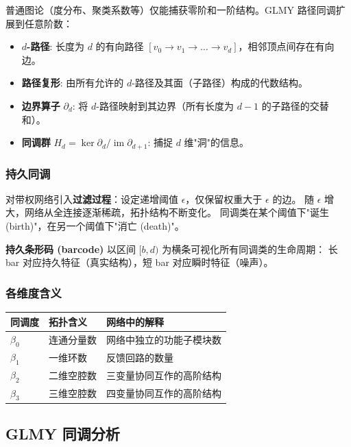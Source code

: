 \documentclass[12pt,a4paper]{ctexart}
\begin{document}
普通图论（度分布、聚类系数等）仅能捕获零阶和一阶结构。GLMY 路径同调扩展到任意阶数：

\begin{itemize}[leftmargin=*]
    \item \textbf{$d$-路径}: 长度为 $d$ 的有向路径 $[v_0 \to v_1 \to \dots \to v_d]$，相邻顶点间存在有向边。
    \item \textbf{路径复形}: 由所有允许的 $d$-路径及其面（子路径）构成的代数结构。
    \item \textbf{边界算子} $\partial_d$: 将 $d$-路径映射到其边界（所有长度为 $d-1$ 的子路径的交替和）。
    \item \textbf{同调群} $H_d = \ker \partial_d / \operatorname{im} \partial_{d+1}$: 捕捉 $d$ 维"洞"的信息。
\end{itemize}

\subsubsection{持久同调}

对带权网络引入\textbf{过滤过程}：设定递增阈值 $\epsilon$，仅保留权重大于 $\epsilon$ 的边。
随 $\epsilon$ 增大，网络从全连接逐渐稀疏，拓扑结构不断变化。
同调类在某个阈值下"诞生 (birth)"，在另一个阈值下"消亡 (death)"。

\textbf{持久条形码 (barcode)} 以区间 $[b, d)$ 为横条可视化所有同调类的生命周期：
长 bar 对应持久特征（真实结构），短 bar 对应瞬时特征（噪声）。

\subsubsection{各维度含义}

\begin{center}
\begin{tabular}{@{}lll@{}}
\toprule
\textbf{同调度} & \textbf{拓扑含义} & \textbf{网络中的解释} \\
\midrule
$\beta_0$ & 连通分量数 & 网络中独立的功能子模块数 \\
$\beta_1$ & 一维环数   & 反馈回路的数量 \\
$\beta_2$ & 二维空腔数 & 三变量协同互作的高阶结构 \\
$\beta_3$ & 三维空腔数 & 四变量协同互作的高阶结构 \\
\bottomrule
\end{tabular}
\end{center}

\subsection{GLMY 同调分析}
\end{document}
